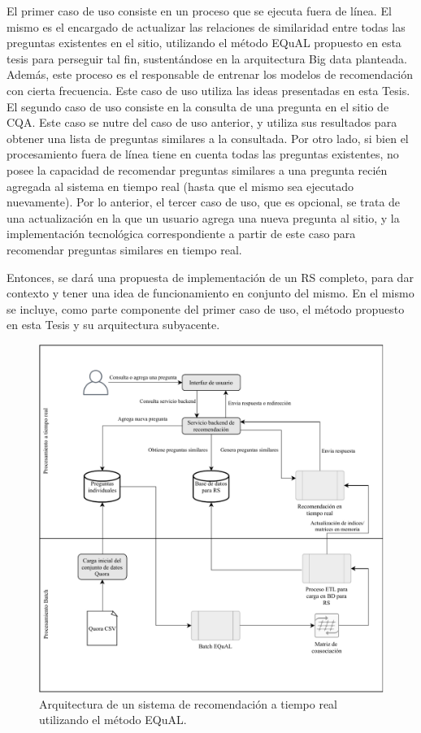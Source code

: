 \bigskip El primer caso de uso consiste en un proceso que se ejecuta fuera de línea. El mismo es el encargado de actualizar las relaciones de similaridad entre todas las preguntas existentes en el sitio, utilizando el método EQuAL propuesto en esta tesis para perseguir tal fin, sustentándose en la arquitectura Big data planteada. Además, este proceso es el responsable de entrenar los modelos de recomendación con cierta frecuencia. Este caso de uso utiliza las ideas presentadas en esta Tesis. El segundo caso de uso consiste en la consulta de una pregunta en el sitio de CQA. Este caso se nutre del caso de uso anterior, y utiliza sus resultados para obtener una lista de preguntas similares a la consultada. Por otro lado, si bien el procesamiento fuera de línea tiene en cuenta todas las preguntas existentes, no posee la capacidad de recomendar preguntas similares a una pregunta recién agregada al sistema en tiempo real (hasta que el mismo sea ejecutado nuevamente). Por lo anterior, el tercer caso de uso, que es opcional, se trata de una actualización en la que un usuario agrega una nueva pregunta al sitio, y la implementación tecnológica correspondiente a partir de este caso para recomendar preguntas similares en tiempo real.

\bigskip Entonces, se dará una propuesta de implementación de un RS completo, para dar contexto y tener una idea de funcionamiento en conjunto del mismo. En el mismo se incluye, como parte componente del primer caso de uso, el método propuesto en esta Tesis y su arquitectura subyacente.

\bigskip
\begin{figure}[h!]
	\centering
	\includegraphics[width=0.9\linewidth]{8_problema_investigacion/imagenes/implementacion_rs}
	\caption{Arquitectura de un sistema de recomendación a tiempo real utilizando el método EQuAL.}
	\label{fig:implementacionrs}
\end{figure}

